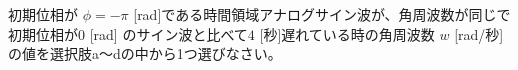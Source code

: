 初期位相が $\phi=-\pi$ [rad]である時間領域アナログサイン波が、角周波数が同じで初期位相が$0$ [rad] のサイン波と比べて$4$ [秒]遅れている時の角周波数 $w$ [rad/秒]の値を選択肢a〜dの中から1つ選びなさい。
